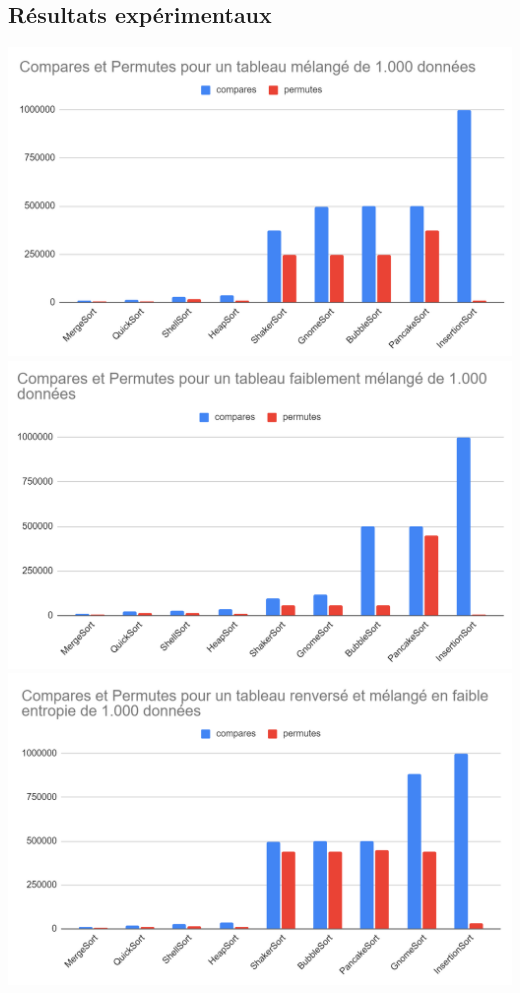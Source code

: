 \documentclass{article}
\begin{document}
\subsection{Résultats expérimentaux}
\includegraphics[scale=0.4]{Annexes/GrapheComparePermuteAll.PNG}
\newline
\includegraphics[scale=0.4]{Annexes/GrapheComparePermuteAllFaible.PNG}
\newline
\includegraphics[scale=0.4]{Annexes/GrapheComparePermuteAllReverseFaible.PNG}
\end{document}
